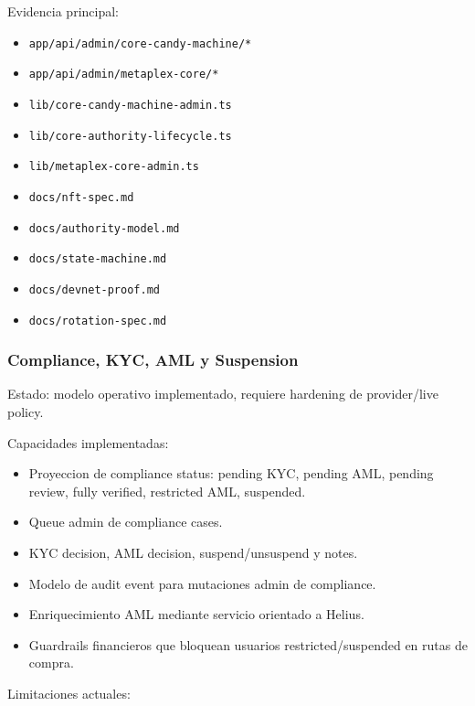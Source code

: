 \documentclass[
  10pt,
  letterpaper,
]{article}
\providecommand{\tightlist}{%
  \setlength{\itemsep}{0pt}\setlength{\parskip}{0pt}}
\let\oldtexttt\texttt
\renewcommand{\texttt}[1]{\oldtexttt{\small #1}}
\begin{document}
Evidencia principal:

\begin{itemize}
\tightlist
\item
  \texttt{app/api/admin/core-candy-machine/*}
\item
  \texttt{app/api/admin/metaplex-core/*}
\item
  \texttt{lib/core-candy-machine-admin.ts}
\item
  \texttt{lib/core-authority-lifecycle.ts}
\item
  \texttt{lib/metaplex-core-admin.ts}
\item
  \texttt{docs/nft-spec.md}
\item
  \texttt{docs/authority-model.md}
\item
  \texttt{docs/state-machine.md}
\item
  \texttt{docs/devnet-proof.md}
\item
  \texttt{docs/rotation-spec.md}
\end{itemize}

\subsubsection{Compliance, KYC, AML y
Suspension}\label{compliance-kyc-aml-y-suspension}

Estado: modelo operativo implementado, requiere hardening de
provider/live policy.

Capacidades implementadas:

\begin{itemize}
\tightlist
\item
  Proyeccion de compliance status: pending KYC, pending AML, pending
  review, fully verified, restricted AML, suspended.
\item
  Queue admin de compliance cases.
\item
  KYC decision, AML decision, suspend/unsuspend y notes.
\item
  Modelo de audit event para mutaciones admin de compliance.
\item
  Enriquecimiento AML mediante servicio orientado a Helius.
\item
  Guardrails financieros que bloquean usuarios restricted/suspended en
  rutas de compra.
\end{itemize}

Limitaciones actuales:
\end{document}
